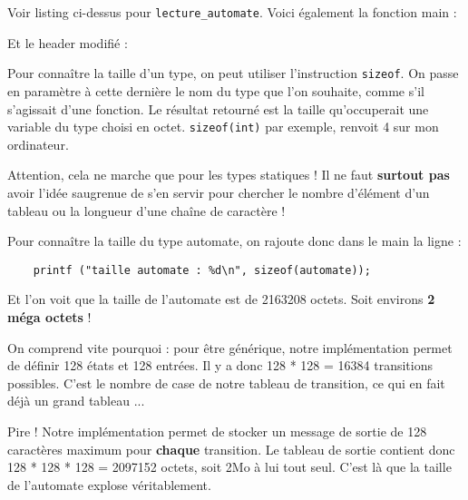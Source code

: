 \documentclass[10pt]{article}
\begin{document}
\begin{enumerate}[label=\textbf{[\alph*]}]
\item Voir listing ci-dessus pour \texttt{lecture\_automate}. Voici
  également la fonction main :

  \lstset{style=customc}
  
  \vspace{0.2cm}

  Et le header modifié :

  \lstset{style=customc}
  
  \vspace{0.2cm}
  \newpage

\item Pour connaître la taille d'un type, on peut utiliser
  l'instruction \texttt{sizeof}. On passe en paramètre à cette
  dernière le nom du type que l'on souhaite, comme s'il s'agissait
  d'une fonction. Le résultat retourné est la taille qu'occuperait une
  variable du type choisi en octet. \texttt{sizeof(int)} par
  exemple, renvoit 4 sur mon ordinateur.
  \vspace{0.2cm}

  Attention, cela ne marche que pour les types statiques ! Il ne faut
  \textbf{surtout pas} avoir l'idée saugrenue de s'en servir pour
  chercher le nombre d'élément d'un tableau ou la longueur d'une
  chaîne de caractère !
  \vspace{0.2cm}

  Pour connaître la taille du type automate, on rajoute donc dans le
  main la ligne :

\begin{lstlisting}
	printf ("taille automate : %d\n", sizeof(automate));
\end{lstlisting}
  \vspace{0.2cm}

  Et l'on voit que la taille de l'automate est de 2163208 octets. Soit
  environs \textbf{2 méga octets} !
  \vspace{0.2cm}

  On comprend vite pourquoi : pour être générique, notre
  implémentation permet de définir 128 états et 128 entrées. Il y a
  donc 128 * 128 = 16384 transitions possibles. C'est le nombre de
  case de notre tableau de transition, ce qui en fait déjà un grand
  tableau ...
  \vspace{0.2cm}

  Pire ! Notre implémentation permet de stocker un message de sortie
  de 128 caractères maximum pour \textbf{chaque} transition. Le
  tableau de sortie contient donc 128 * 128 * 128 = 2097152 octets,
  soit 2Mo à lui tout seul. C'est là que la taille de l'automate
  explose véritablement.
  \vspace{0.2cm}


\end{enumerate}
\end{document}
